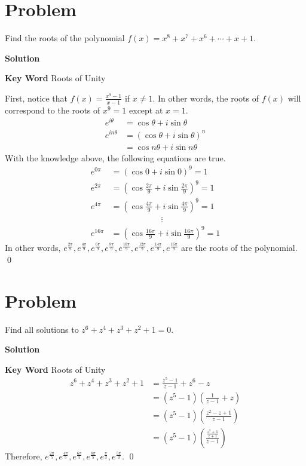 \documentclass{article}
\newenvironment{solution}{\begin{trivlist}\item[]{\bf Solution}}{\qed \end{trivlist}}
\begin{document}
\section*{Problem}
Find the roots of the polynomial $f(x) = x^8 + x^7 + x^6 + \cdots + x + 1$.
\begin{solution}

\textbf{Key Word} Roots of Unity

First, notice that $f(x) = \frac{x^9 - 1}{x - 1}$ if $x \neq 1$. In other words, the roots of $f(x)$ will correspond to the roots of $x^9 = 1$ except at $x = 1$.
\begin{align*}
    e^{i\theta} &= \cos\theta + i\sin\theta \\
    e^{in\theta}
    &= (\cos\theta + i\sin\theta)^n \\
    &= \cos n\theta + i\sin n\theta
\end{align*}
With the knowledge above, the following equations are true.
\begin{align*}
    e^{0\pi} &= \left( \cos 0 + i \sin 0 \right)^9 = 1 \\
    e^{2\pi} &= \left( \cos \frac{2\pi}{9} + i \sin \frac{2\pi}{9} \right)^9 = 1 \\
    e^{4\pi} &= \left( \cos \frac{4\pi}{9} + i \sin \frac{4\pi}{9} \right)^9 = 1 \\
    &\qquad \qquad \qquad \vdots \\
    e^{16\pi} &= \left( \cos \frac{16\pi}{9} + i \sin \frac{16\pi}{9} \right)^9 = 1
\end{align*}
In other words, $\boxed{e^{\frac{2\pi}{9}}, e^{\frac{4\pi}{9}}, e^{\frac{6\pi}{9}}, e^{\frac{8\pi}{9}}, e^{\frac{10\pi}{9}}, e^{\frac{12\pi}{9}}, e^{\frac{14\pi}{9}}, e^{\frac{16\pi}{9}}}$ are the roots of the polynomial.
\end{solution}

\section*{Problem}
Find all solutions to $z^6 + z^4 + z^3 + z^2 + 1 = 0$.
\begin{solution}

\textbf{Key Word} Roots of Unity
\begin{align*}
    z^6 + z^4 + z^3 + z^2 + 1
    &= \frac{z^5 - 1}{z - 1} + z^6 - z \\
    &= \left( z^5 - 1 \right) \left( \frac{1}{z - 1} + z \right) \\
    &= \left( z^5 - 1 \right) \left( \frac{z^2 - z + 1}{z - 1} \right) \\
    &= \left( z^5 - 1 \right) \left( \frac{\frac{z^3 + 1}{z + 1}}{z - 1} \right)
\end{align*}
Therefore, $\boxed{e^\frac{2\pi}{5}, e^\frac{4\pi}{5}, e^\frac{6\pi}{5}, e^\frac{8\pi}{5}, e^\frac{\pi}{3}, e^\frac{5\pi}{3}}$.
\end{solution}
\end{document}

